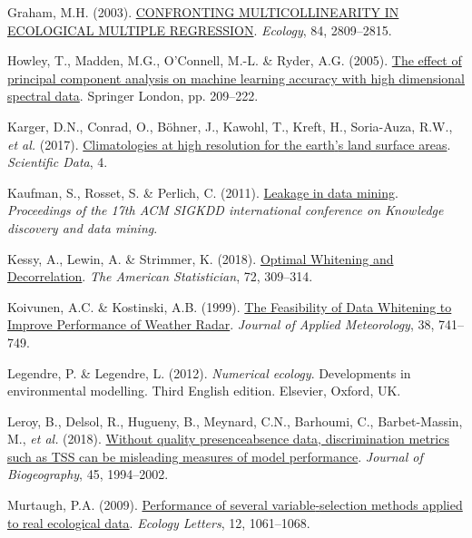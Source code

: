 \documentclass[
  letterpaper,
]{scrbook}
\newlength{\cslhangindent}
\newenvironment{CSLReferences}[2] %
 {\begin{list}{}{%
  \setlength{\itemindent}{0pt}
  \setlength{\leftmargin}{0pt}
  \setlength{\parsep}{0pt}
  \ifodd #1
   \setlength{\leftmargin}{\cslhangindent}
   \setlength{\itemindent}{-1\cslhangindent}
  \fi
  \setlength{\itemsep}{#2\baselineskip}}}
 {\end{list}}
\begin{document}
\begin{CSLReferences}{1}{0}
Graham, M.H. (2003). \href{https://doi.org/10.1890/02-3114}{CONFRONTING
MULTICOLLINEARITY IN ECOLOGICAL MULTIPLE REGRESSION}. \emph{Ecology},
84, 2809--2815.

Howley, T., Madden, M.G., O'Connell, M.-L. \& Ryder, A.G. (2005).
\href{https://doi.org/10.1007/1-84628-224-1_16}{The effect of principal
component analysis on machine learning accuracy with high dimensional
spectral data}. Springer London, pp. 209--222.

Karger, D.N., Conrad, O., Böhner, J., Kawohl, T., Kreft, H., Soria-Auza,
R.W., \emph{et al.} (2017).
\href{https://doi.org/10.1038/sdata.2017.122}{Climatologies at high
resolution for the earth{'}s land surface areas}. \emph{Scientific
Data}, 4.

Kaufman, S., Rosset, S. \& Perlich, C. (2011).
\href{https://doi.org/10.1145/2020408.2020496}{Leakage in data mining}.
\emph{Proceedings of the 17th ACM SIGKDD international conference on
Knowledge discovery and data mining}.

Kessy, A., Lewin, A. \& Strimmer, K. (2018).
\href{https://doi.org/10.1080/00031305.2016.1277159}{Optimal Whitening
and Decorrelation}. \emph{The American Statistician}, 72, 309--314.

Koivunen, A.C. \& Kostinski, A.B. (1999).
\href{https://doi.org/10.1175/1520-0450(1999)038\%3C0741:tfodwt\%3E2.0.co;2}{The
Feasibility of Data Whitening to Improve Performance of Weather Radar}.
\emph{Journal of Applied Meteorology}, 38, 741--749.

Legendre, P. \& Legendre, L. (2012). \emph{Numerical ecology}.
Developments in environmental modelling. Third English edition.
Elsevier, Oxford, UK.

Leroy, B., Delsol, R., Hugueny, B., Meynard, C.N., Barhoumi, C.,
Barbet-Massin, M., \emph{et al.} (2018).
\href{https://doi.org/10.1111/jbi.13402}{Without quality
presence{\textendash}absence data, discrimination metrics such as TSS
can be misleading measures of model performance}. \emph{Journal of
Biogeography}, 45, 1994--2002.

Murtaugh, P.A. (2009).
\href{https://doi.org/10.1111/j.1461-0248.2009.01361.x}{Performance of
several variable{-}selection methods applied to real ecological data}.
\emph{Ecology Letters}, 12, 1061--1068.


\end{CSLReferences}
\end{document}
